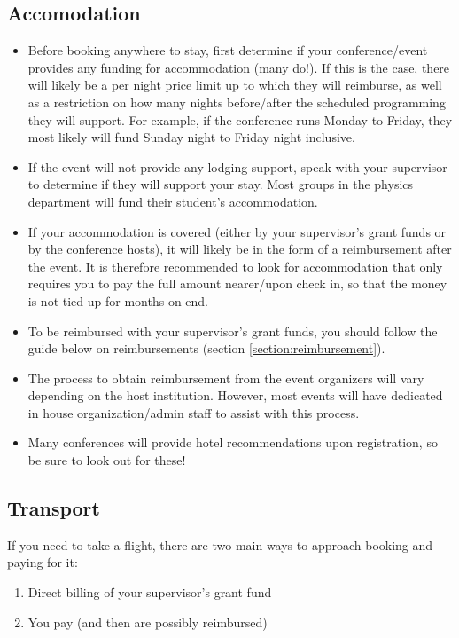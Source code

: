     \subsection{Accomodation} 
    \begin{itemize}
    \item Before booking anywhere to stay, first determine if your conference/event provides any funding for accommodation (many do!). If this is the case, there will likely be a per night price limit up to which they will reimburse, as well as a restriction on how many nights before/after the scheduled programming they will support. For example, if the conference runs Monday to Friday, they most likely will fund Sunday night to Friday night inclusive.
    \item If the event will not provide any lodging support, speak with your supervisor to determine if they will support your stay. Most groups in the physics department will fund their student’s accommodation.
    \item If your accommodation is covered (either by your supervisor’s grant funds or by the conference hosts), it will likely be in the form of a reimbursement after the event. It is therefore recommended to look for accommodation that only requires you to pay the full amount nearer/upon check in, so that the money is not tied up for months on end.
    \item To be reimbursed with your supervisor’s grant funds, you should follow the guide below on reimbursements (section \hyperref[section:reimbursement]{\textcolor{purble}{\ref*{section:reimbursement}}}).
    \item The process to obtain reimbursement from the event organizers will vary depending on the host institution. However, most events will have dedicated in house organization/admin staff to assist with this process.
    \item Many conferences will provide hotel recommendations upon registration, so be sure to look out for these!\\

    \end{itemize}


    \subsection{Transport} 

    \noindent If you need to take a flight, there are two main ways to approach booking and paying for it:
    \begin{enumerate}
        \item Direct billing of your supervisor’s grant fund
        \item You pay (and then are possibly reimbursed)
    \end{enumerate}

